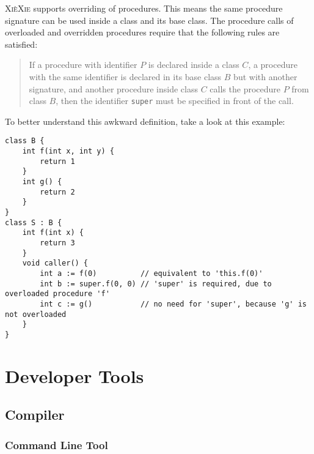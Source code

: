 \documentclass{report}
\def\xiexie{\textsc{Xi\`eXie}\xspace}
\begin{document}
\xiexie supports overriding of procedures. This means the same procedure signature can be used inside a class and its
base class. The procedure calls of overloaded and overridden procedures require that the following rules are satisfied:
\begin{quote}
	If a procedure with identifier $P$ is declared inside a class $C$, a procedure with the same identifier is declared
	in its base class $B$ but with another signature, and another procedure inside class $C$ calls the procedure $P$
	from class $B$, then the identifier \texttt{super} must be specified in front of the call.
\end{quote}
To better understand this awkward definition, take a look at this example:
\begin{lstlisting}
class B {
    int f(int x, int y) {
        return 1
    }
    int g() {
        return 2
    }
}
class S : B {
    int f(int x) {
        return 3
    }
    void caller() {
        int a := f(0)          // equivalent to 'this.f(0)'
        int b := super.f(0, 0) // 'super' is required, due to overloaded procedure 'f'
        int c := g()           // no need for 'super', because 'g' is not overloaded
    }
}
\end{lstlisting}



\part{Developer Tools}



\chapter{Compiler}



\section{Command Line Tool}
\end{document}
